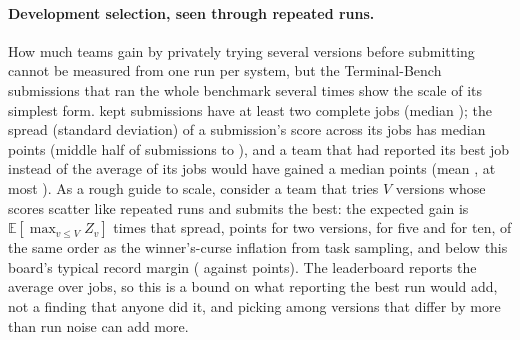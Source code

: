 \documentclass[11pt]{article}
\newcommand{\E}{\mathbb{E}}
\begin{document}
\paragraph{Development selection, seen through repeated runs.}
How much teams gain by privately trying several versions before submitting cannot be measured from one run per system, but the Terminal-Bench submissions that ran the whole benchmark several times show the scale of its simplest form.
\NumTBJobSubs{} kept submissions have at least two complete jobs (median \NumTBJobMedianJobs); the spread (standard deviation) of a submission's score across its jobs has median \NumTBJobSd{} points (middle half of submissions \NumTBJobSdLo{} to \NumTBJobSdHi), and a team that had reported its best job instead of the average of its jobs would have gained a median \NumTBJobInflMedian{} points (mean \NumTBJobInflMean, at most \NumTBJobInflMax).
As a rough guide to scale, consider a team that tries $V$ versions whose scores scatter like repeated runs and submits the best: the expected gain is $\E[\max_{v\le V} Z_v]$ times that spread, \NumTBJobInflVTwo{} points for two versions, \NumTBJobInflVFive{} for five and \NumTBJobInflVTen{} for ten, of the same order as the winner's-curse inflation from task sampling, and below this board's typical record margin (\NumTBJobInflVFive{} against \NumTBMedianMargin{} points).
The leaderboard reports the average over jobs, so this is a bound on what reporting the best run would add, not a finding that anyone did it, and picking among versions that differ by more than run noise can add more.
\end{document}
